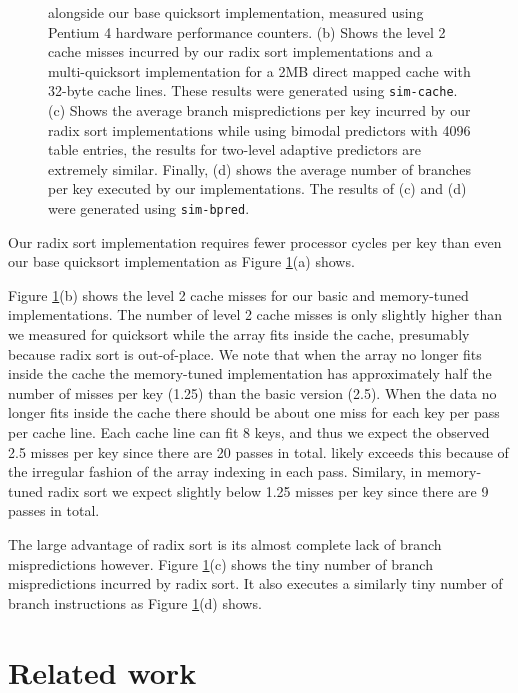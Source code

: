 \documentclass[acmtocl]{acmtrans2m}
\begin{document}
\begin{figure}
{alongside our base quicksort implementation, measured using Pentium 4 hardware
performance counters. (b) Shows the level 2 cache misses incurred by our radix
sort implementations and a multi-quicksort implementation for a 2MB direct
mapped cache with 32-byte cache lines. These results were generated using
\texttt{sim-cache}.  (c) Shows the average branch mispredictions per key
incurred by our radix sort implementations while using bimodal predictors with
4096 table entries, the results for two-level adaptive predictors are extremely
similar. Finally, (d) shows the average number of branches per key executed by
our  implementations. The results of (c) and (d) were generated using
\texttt{sim-bpred}.}
\label{radixsort_results_pictures}
\end{figure}

Our radix sort implementation requires fewer processor cycles per key than even
our base quicksort implementation as Figure \ref{radixsort_results_pictures}(a)
shows. 

Figure \ref{radixsort_results_pictures}(b) shows the level 2 cache misses for
our basic and memory-tuned implementations.  The number of level 2 cache misses
is only slightly higher than we measured for quicksort while the array fits
inside the cache, presumably because radix sort is out-of-place.  We note that
when the array no longer fits inside the cache the memory-tuned implementation
has approximately half the number of misses per key (1.25) than the basic
version (2.5). When the data no longer fits inside the cache there should be
about one miss for each key per pass per cache line.  Each cache line can fit 8
keys, and thus we expect the observed 2.5 misses per key since there are 20
passes in total.  likely exceeds this because of the irregular fashion of the
array indexing in each pass. Similary, in memory-tuned radix sort we expect
slightly below 1.25 misses per key since there are 9 passes in total.

The large advantage of radix sort is its almost complete lack of branch
mispredictions however. Figure \ref{radixsort_results_pictures}(c) shows the
tiny number of branch mispredictions incurred by radix sort. It also executes a
similarly tiny number of branch instructions as Figure
\ref{radixsort_results_pictures}(d) shows. 

\section{Related work} 
\label{RelatedWork}
\end{document}
